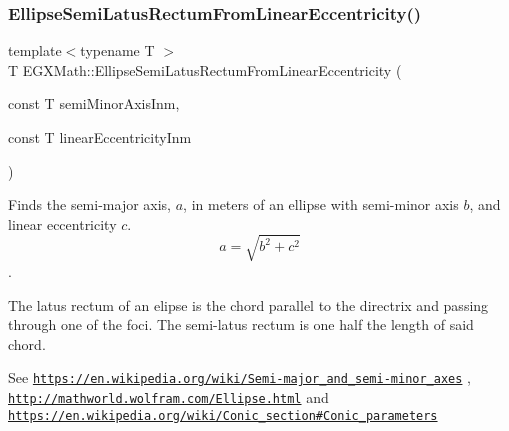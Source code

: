 \mbox{\label{group___e_g_x_math-_geometry-2_d-_ellipse-_semi_latus_rectum_ga41f9f0fcd4b1169a4e908496cdab158d}} 
\subsubsection{\texorpdfstring{Ellipse\+Semi\+Latus\+Rectum\+From\+Linear\+Eccentricity()}{EllipseSemiLatusRectumFromLinearEccentricity()}}
{\footnotesize\ttfamily template$<$typename T $>$ \\
T E\+G\+X\+Math\+::\+Ellipse\+Semi\+Latus\+Rectum\+From\+Linear\+Eccentricity (\begin{DoxyParamCaption}\item[{const T}]{semi\+Minor\+Axis\+Inm,  }\item[{const T}]{linear\+Eccentricity\+Inm }\end{DoxyParamCaption})}



Finds the semi-\/major axis, $a$, in meters of an ellipse with semi-\/minor axis $b$, and linear eccentricity $c$. \[ a=\sqrt{b^2+c^2} \]. 

The latus rectum of an elipse is the chord parallel to the directrix and passing through one of the foci. The semi-\/latus rectum is one half the length of said chord.

See \href{https://en.wikipedia.org/wiki/Semi-major_and_semi-minor_axes}{\tt https\+://en.\+wikipedia.\+org/wiki/\+Semi-\/major\+\_\+and\+\_\+semi-\/minor\+\_\+axes} , \href{http://mathworld.wolfram.com/Ellipse.html}{\tt http\+://mathworld.\+wolfram.\+com/\+Ellipse.\+html} and \href{https://en.wikipedia.org/wiki/Conic_section#Conic_parameters}{\tt https\+://en.\+wikipedia.\+org/wiki/\+Conic\+\_\+section\#\+Conic\+\_\+parameters}


